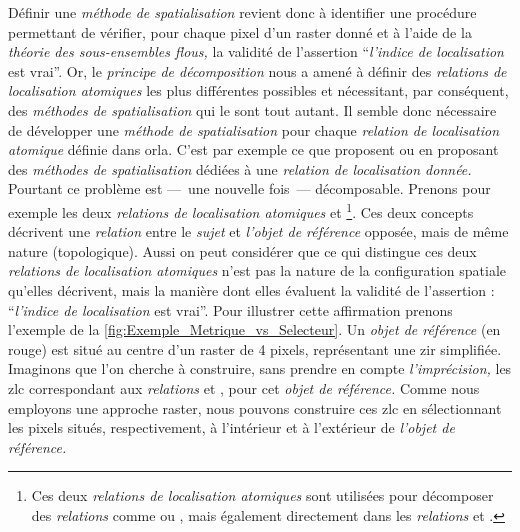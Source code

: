 Définir une \emph{méthode de spatialisation} revient donc à identifier une procédure permettant de vérifier, pour chaque pixel d'un raster donné et à l'aide de la \emph{théorie des sous-ensembles flous,} la validité de l'assertion \enquote{\emph{l'indice de localisation} est vrai}. Or, le \emph{principe de décomposition} nous a amené à définir des \emph{relations de localisation atomiques} les plus différentes possibles et nécessitant, par conséquent, des \emph{méthodes de spatialisation} qui le sont tout autant. Il semble donc nécessaire de développer une \emph{méthode de spatialisation} pour chaque \emph{relation de localisation atomique} définie dans \ac{orla}. C'est par exemple ce que proposent \textcite{Vanegas2011} ou \textcite{Takemura2012} en proposant des \emph{méthodes de spatialisation} dédiées à une \emph{relation de localisation donnée.} Pourtant ce problème est ---~une nouvelle fois~--- décomposable. Prenons pour exemple les deux \emph{relations de localisation atomiques}  et  \footnote{Ces deux \emph{relations de localisation atomiques} sont utilisées pour décomposer des \emph{relations} comme \protect{} ou \protect{}, mais également directement dans les \emph{relations} \protect{} et \protect{}.}. Ces deux concepts décrivent une \emph{relation} entre le \emph{sujet} et \emph{l'objet de référence} opposée, mais de même nature (\ie topologique). Aussi on peut considérer que ce qui distingue ces deux \emph{relations de localisation atomiques} n'est pas la nature de la configuration spatiale qu'elles décrivent, mais la manière dont elles évaluent la validité de l'assertion : \enquote{\emph{l'indice de localisation} est vrai}. Pour illustrer cette affirmation prenons l'exemple de la \autoref{fig:Exemple_Metrique_vs_Selecteur}. Un \emph{objet de référence} (en rouge) est situé au centre d'un raster de 4 pixels, représentant une \ac{zir} simplifiée. Imaginons que l'on cherche à construire, sans prendre en compte \emph{l'imprécision,} les \ac{zlc} correspondant aux \emph{relations}  et , pour cet \emph{objet de référence.} Comme nous employons une approche raster, nous pouvons construire ces \ac{zlc} en sélectionnant les pixels situés, respectivement, à l'intérieur et à l'extérieur de \emph{l'objet de référence.}
%
